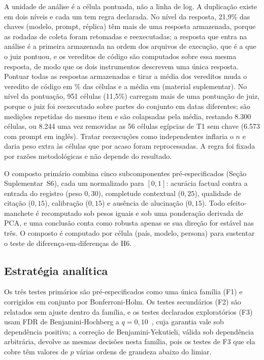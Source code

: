 A unidade de análise é a célula pontuada, não a linha de log. A duplicação
existe em dois níveis e cada um tem regra declarada. No nível da resposta,
21,9\% das chaves (modelo, prompt, réplica) têm mais de uma resposta armazenada,
porque as rodadas de coleta foram retomadas e reexecutadas; a resposta que
entra na análise é a primeira armazenada na ordem dos arquivos de execução, que
é a que o juiz pontuou, e os vereditos de código são computados sobre essa
mesma resposta, de modo que os dois instrumentos descrevem uma única resposta.
Pontuar todas as respostas armazenadas e tirar a média dos vereditos muda o
veredito de código em \ndupchange\% das células e a média em \ndupmean{} (material
suplementar). No nível da pontuação, 951 células (11,5\%) carregam mais de uma
pontuação de juiz, porque o juiz foi reexecutado sobre partes do conjunto em
datas diferentes; são medições repetidas do mesmo item e são colapsadas pela
média, restando 8.300 células, ou 8.244 uma vez removidas as 56 células
egípcias de T1 sem chave (6.573 com prompt em inglês). Tratar reexecuções como
independentes inflaria o $n$ e daria peso extra às células que por acaso foram
reprocessadas. A regra foi fixada por razões metodológicas e não depende do
resultado.

O composto primário combina cinco subcomponentes pré-especificados (Seção
Suplementar~S6), cada um normalizado para $[0,1]$: acurácia factual contra a
entrada do registro (peso $0,30$), completude contextual ($0,25$), qualidade de
citação ($0,15$), calibração ($0,15$) e ausência de alucinação ($0,15$). Todo
efeito-manchete é recomputado sob pesos iguais e sob uma ponderação derivada de
PCA, e uma conclusão conta como robusta apenas se sua direção for estável nas
três. O composto é computado por célula (país, modelo, persona) para sustentar o
teste de diferença-em-diferenças de H6.

\subsection{Estratégia analítica}

Os três testes primários são pré-especificados como uma única família (F1) e
corrigidos em conjunto por Bonferroni-Holm. Os testes secundários (F2) são
relatados sem ajuste dentro da família, e os testes declarados exploratórios
(F3) usam FDR de Benjamini-Hochberg a $q=0,10$~\citep{benjamini1995fdr}, cuja
garantia vale sob dependência positiva; a correção de Benjamini-Yekutieli,
válida sob dependência arbitrária, devolve as mesmas decisões nesta família,
pois os testes de F3 que ela cobre têm valores de $p$ várias ordens de grandeza
abaixo do limiar.

